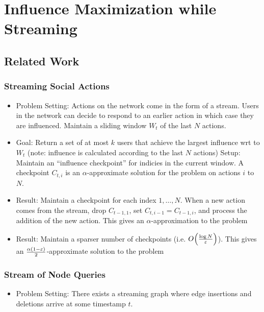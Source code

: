 \section{Influence Maximization while Streaming}

\subsection{Related Work}

\subsubsection{Streaming Social Actions}

\begin{itemize}[label=--]
    \itemsep0em 
    \item Problem Setting: Actions on the network come in the form of a stream. Users in the network can decide to respond to an earlier action in which case they are influenced. Maintain a sliding window $W_t$ of the last $N$ actions. 
    \item Goal: Return a set of at most $k$ users that achieve the largest influence wrt to $W_t$ (note: influence is calculated according to the last $N$ actions)
        Setup: Maintain an “influence checkpoint” for indicies in the current window. A checkpoint $C_{t, i}$ is an $\alpha$-approximate solution for the problem on actions $i$ to $N$. 
    \item Result: Maintain a checkpoint for each index $1, \ldots, N$. When a new action comes from the stream, drop $C_{t-1, 1}$, set $C_{t, i-1} = C_{t-1, i}$, and process the addition of the new action. This gives an $\alpha$-approximation to the problem
    \item Result: Maintain a sparser number of checkpoints (i.e.\! $O_{} \! \left( \frac{\log N}{\varepsilon} \right)$). This gives an $\frac{\alpha \left( 1 - \varepsilon \right)}{2}$-approximate solution to the problem
\end{itemize}

\subsubsection{Stream of Node Queries}

\begin{itemize}[label=--]
    \itemsep0em 
    \item Problem Setting: There exists a streaming graph where edge insertions and deletions arrive at some timestamp $t$. 
\end{itemize}